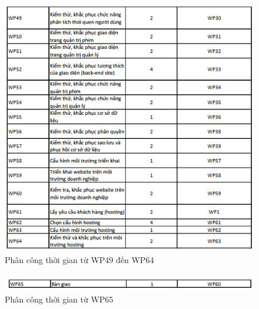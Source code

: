 \documentclass[a4paper]{book}
\begin{document}
\begin{figure}
	\centering
	\includegraphics[width=0.7\textheight]{Timing_49_64.png}
	\caption{Phân công thời gian từ WP49 đến WP64}
	\label{fig:Timing_49_64}
\end{figure}
\begin{figure}
	\centering
	\includegraphics[width=0.7\textheight]{Timing_65.png}
	\caption{Phân công thời gian từ WP65}
	\label{fig:Timing_65}
\end{figure}
\pagebreak
\end{document}
